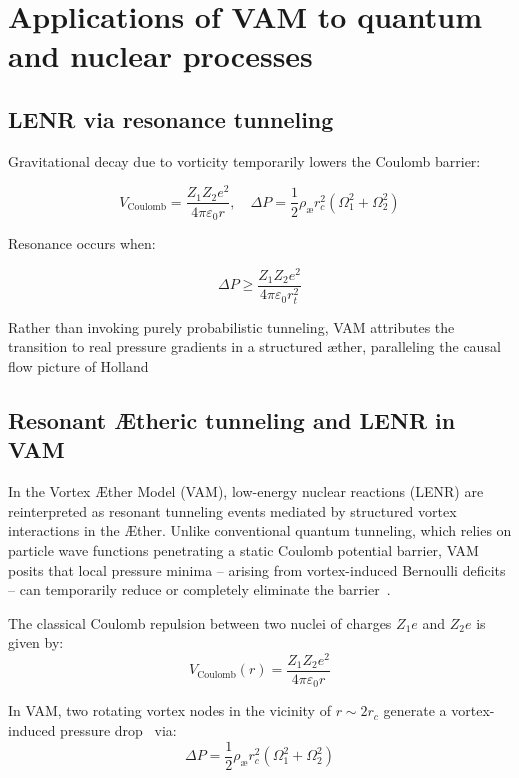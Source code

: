 \section{Applications of VAM to quantum and nuclear processes}
\label{sec:LENR_QED}
\subsection*{LENR via resonance tunneling}

Gravitational decay due to vorticity temporarily lowers the Coulomb barrier:

\begin{equation}
    V_\text{Coulomb} = \frac{Z_1 Z_2 e^2}{4\pi \varepsilon_0 r}, \quad \Delta P = \frac{1}{2} \rho_\text{\ae} r_c^2 (\Omega_1^2 + \Omega_2^2)
\end{equation}

Resonance occurs when:

\begin{equation}
    \Delta P \geq \frac{Z_1 Z_2 e^2}{4\pi \varepsilon_0 r_t^2}
\end{equation}

Rather than invoking purely probabilistic tunneling, VAM attributes the transition to real pressure gradients in a structured æther, paralleling the causal flow picture of Holland~\cite{holland1993quantum}

\subsection*{Resonant Ætheric tunneling and LENR in VAM}

In the Vortex Æther Model (VAM), low-energy nuclear reactions (LENR) are reinterpreted as resonant tunneling events mediated by structured vortex interactions in the Æther. Unlike conventional quantum tunneling, which relies on particle wave functions penetrating a static Coulomb potential barrier, VAM posits that local pressure minima – arising from vortex-induced Bernoulli deficits – can temporarily reduce or completely eliminate the barrier~\cite{Barcelo2011,volovik2003}.

The classical Coulomb repulsion between two nuclei of charges \( Z_1 e \) and \( Z_2 e \) is given by:
\begin{equation}
    V_\text{Coulomb}(r) = \frac{Z_1 Z_2 e^2}{4\pi \varepsilon_0 r}
\end{equation}

In VAM, two rotating vortex nodes in the vicinity of \( r \sim 2r_c \) generate a vortex-induced pressure drop~\cite{Saffman1992} via:
\begin{equation}
    \Delta P = \frac{1}{2} \rho_\text{\ae} r_c^2 (\Omega_1^2 + \Omega_2^2)
\end{equation}

